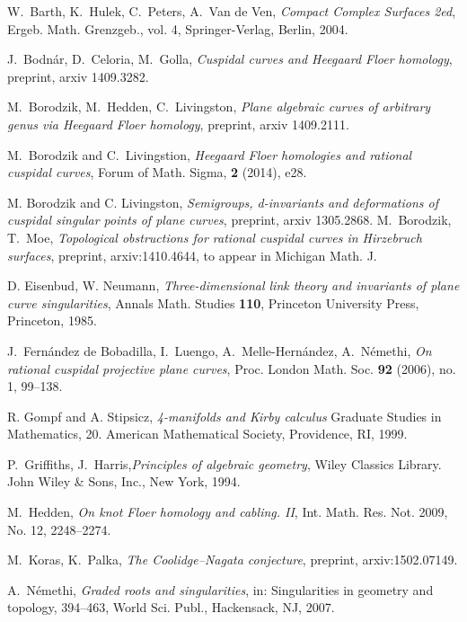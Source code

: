 \documentclass[11pt]{amsart}
\numberwithin{equation}{section}
\theoremstyle{plain}
\theoremstyle{definition}
\begin{document}
\begin{thebibliography}{XXX}

 W.~Barth, K.~Hulek, C.~Peters, A.~Van de Ven, 
\emph{Compact Complex Surfaces 2ed}, Ergeb. Math. Grenzgeb., vol. 4, Springer-Verlag, Berlin, 2004.

 J.~Bodn\'ar, D.~Celoria, M.~Golla, \emph{Cuspidal curves and Heegaard Floer homology}, preprint, arxiv 1409.3282. 

 M.~Borodzik, M.~Hedden, C.~Livingston, \emph{Plane algebraic curves of arbitrary genus via Heegaard Floer homology}, preprint,
arxiv 1409.2111.
 
 M.~Borodzik and C.~Livingstion, {\em Heegaard Floer homologies and rational cuspidal curves}, Forum of Math. Sigma, \textbf{2} (2014), e28.

  M. Borodzik and C. Livingston, {\it Semigroups, d-invariants and deformations of cuspidal singular points of plane curves}, preprint,
arxiv 1305.2868.   
 M.~Borodzik, T.~Moe, \emph{Topological obstructions for rational cuspidal curves in Hirzebruch surfaces},
preprint, arxiv:1410.4644, to appear in Michigan Math. J.

 D. Eisenbud, W. Neumann, \textit{Three-dimensional
link theory and invariants of plane curve singularities}, Annals Math.
Studies \textbf{110}, Princeton University Press, Princeton, 1985.

 J.~Fern\'andez de Bobadilla, I.~Luengo, A.~Melle-Hern\'andez, A.~N\'emethi, 
\emph{On rational cuspidal projective plane curves}, Proc. London Math. Soc. \textbf{92} (2006), no. 1, 99--138. 

  R. Gompf and A. Stipsicz, {\it  4-manifolds and Kirby calculus} Graduate Studies in Mathematics, 20. American Mathematical Society, Providence, RI, 1999. 

P.~Griffiths, J.~Harris,\emph{Principles of algebraic geometry}, Wiley Classics Library. John Wiley \& Sons, Inc., New York, 1994.
 
 M.~Hedden,
\emph{On knot Floer homology and cabling. II},
Int. Math. Res. Not.  2009, No. 12, 2248--2274.

 M.~Koras, K.~Palka, \emph{The Coolidge--Nagata conjecture},
preprint, arxiv:1502.07149.

 A.~N\'emethi, \emph{Graded roots and singularities}, in: Singularities in geometry and topology, 394--463, World Sci. Publ., 
Hackensack, NJ, 2007.


\end{thebibliography}
\end{document}
